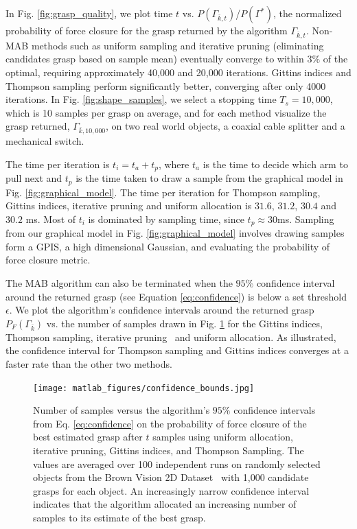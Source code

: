 \documentclass[10pt, conference]{ieeeconf}      %
\begin{document}
In Fig. \ref{fig:grasp_quality}, we plot time $t$ vs. $P(\Gamma_{\bar{k},t})$/$P(\Gamma^*)$, the normalized probability of force closure for the grasp returned by the algorithm $\Gamma_{\bar{k},t}$.  Non-MAB methods such as uniform sampling and iterative pruning (eliminating candidates grasp based on sample mean) eventually converge to within 3$\%$ of the optimal, requiring approximately 40,000 and 20,000 iterations.  Gittins indices and Thompson sampling  perform significantly better, converging after only 4000 iterations. In Fig. \ref{fig:shape_samples}, we select a stopping time $T_s=10,000$, which is 10 samples per grasp on average, and for each method visualize the grasp  returned, $\Gamma_{\bar{k},10,000}$, on two real world objects, a coaxial cable splitter and a mechanical switch. 

The time per iteration is $t_{i} = t_{a}+t_{p}$, where $t_{a}$ is the time to decide which arm to pull next and $t_{p}$ is the time taken to draw a sample from the graphical model in Fig. \ref{fig:graphical_model}. The time per iteration for Thompson sampling, Gittins indices, iterative pruning and uniform allocation is $31.6$, $31.2$, $30.4$ and $30.2$ ms. Most of $t_{i}$ is dominated by sampling time, since $t_{p} \approx 30$ms. Sampling from our graphical model in Fig. \ref{fig:graphical_model} involves drawing samples form a GPIS, a high dimensional Gaussian, and evaluating the probability of force closure metric. 

The MAB algorithm can also be terminated when the $95\%$ confidence interval around the returned grasp (see Equation \ref{eq:confidence}) is below a set threshold $\epsilon$. We plot the algorithm's confidence intervals around the returned grasp $P_F(\Gamma_{\bar{k}})$ vs. the number of samples drawn in Fig. \ref{fig:confidence} for the Gittins indices, Thompson sampling, iterative pruning~\cite{kehoe2012toward} and uniform allocation.  As illustrated, the confidence interval for Thompson sampling and Gittins indices converges at a faster rate than the other two methods. 


\begin{figure}[t!]
\centering
\texttt{[image: matlab\_figures/confidence\_bounds.jpg]}
\caption{ Number of samples versus the algorithm's $95\%$ confidence intervals from Eq. \ref{eq:confidence} on the probability of force closure of the best estimated grasp after $t$ samples using uniform allocation, iterative pruning, Gittins indices, and Thompson Sampling. The values are averaged over 100 independent runs on randomly selected objects from the Brown Vision 2D Dataset~\cite{brown} with 1,000 candidate grasps for each object. An increasingly narrow confidence interval indicates that the algorithm allocated an increasing number of samples to its estimate of the best grasp. }

\vspace*{-10pt}
\label{fig:confidence}
\end{figure}
\end{document}
